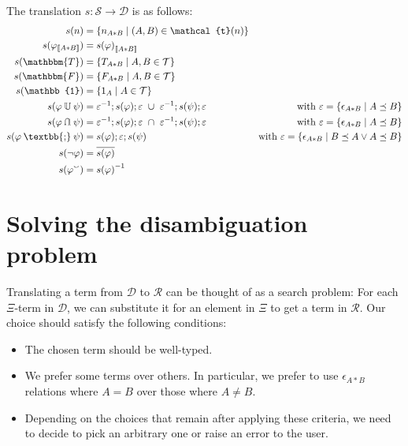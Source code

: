 \documentclass[12pt]{article}
\newcommand{\typesemi}{\mathbin{\text{\textbb{;}}}}
\newcommand{\typeunion}{\mathbin{\mathbb{U}}}
\newcommand{\typeinter}{\mathbin{\text{\rotatebox[origin=c]{180}{$\typeunion$}}}}
\newcommand{\typevee}{\mathbbm{T}}
\newcommand{\typenil}{\mathbbm{F}}
\newcommand{\typecomp}[1]{\neg{#1}}
\newcommand{\typeconv}[1]{{#1}^\smallsmile}
\newcommand{\typeident}{\mathbb{1}}
\newcommand{\typetyped}[2]{{#1}_{\llbracket #2 \rrbracket}}
\newcommand{\conv}[1]{{#1}^{-1}}
\begin{document}
The translation $s : \mathcal{S} \to \mathcal{D}$ is as follows:
\begin{align*}
s(n) &= \{n_{A*B} \mid (A,B)\in\mathcal{t}(n)\}\\
s(\typetyped{\varphi}{A*B}) &= \typetyped{s(\varphi)}{A*B}\\
s(\typevee) &= \{T_{A*B} \mid A,B\in\mathcal{T}\}\\
s(\typenil) &= \{F_{A*B} \mid A,B\in\mathcal{T}\}\\
s(\typeident) &= \{1_{A} \mid A\in\mathcal{T}\}\\
s(\varphi \typeunion \psi) &= \conv{\varepsilon};s(\varphi);\varepsilon\ \cup\ \conv{\varepsilon};s(\psi);\varepsilon&\quad\text{with $\varepsilon = \{\epsilon_{A*B} \mid A\preceq B \}$} \\
s(\varphi \typeinter \psi) &= \conv{\varepsilon};s(\varphi);\varepsilon\ \cap\ \conv{\varepsilon};s(\psi);\varepsilon&\quad\text{with $\varepsilon = \{\epsilon_{A*B} \mid A\preceq B \}$}\\
s(\varphi \typesemi \psi) &= s(\varphi);\varepsilon;s(\psi)&\text{with $\varepsilon = \{\epsilon_{A*B} \mid B\preceq A \vee A\preceq B \}$}\\
s(\typecomp{\varphi}) &= \overline{s(\varphi)}\\
s(\typeconv{\varphi}) &= \conv{s(\varphi)}
\end{align*}



\section{Solving the disambiguation problem}
Translating a term from $\mathcal{D}$ to $\mathcal{R}$ can be thought of as a search problem:
For each $\Xi$-term in $\mathcal{D}$, we can substitute it for an element in $\Xi$ to get a term in $\mathcal{R}$.
Our choice should satisfy the following conditions:
\begin{itemize}
\item The chosen term should be well-typed.
\item We prefer some terms over others. In particular, we prefer to use $\epsilon_{A*B}$ relations where $A = B$ over those where $A\neq B$.
\item Depending on the choices that remain after applying these criteria, we need to decide to pick an arbitrary one or raise an error to the user.
\end{itemize}
\end{document}

